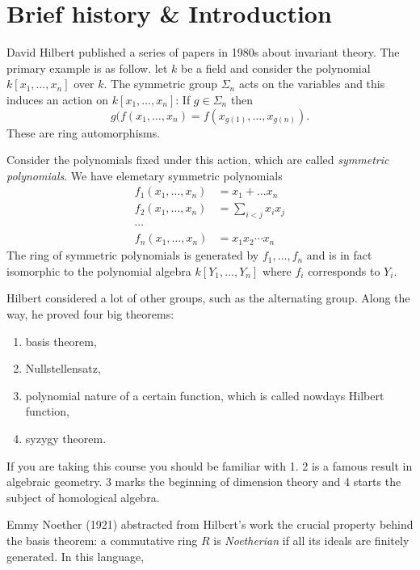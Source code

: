 \documentclass[a4paper]{article}
\begin{document}


\tableofcontents

\setcounter{section}{-1}

\section{Brief history \& Introduction}

David Hilbert published a series of papers in 1980s about invariant theory. The primary example is as follow. let \(k\)  be a field and consider the polynomial \(k[x_1, \dots, x_n]\) over \(k\). The symmetric group \(\Sigma_n\) acts on the variables and this induces an action on \(k[x_1, \dots, x_n]\): If \(g \in \Sigma_n\) then
\[
  g(f(x_1, \dots, x_n) = f(x_{g(1)}, \dots, x_{g(n)}).
\]
These are ring automorphisms.

Consider the polynomials fixed under this action, which are called \emph{symmetric polynomials}. We have elemetary symmetric polynomials
\begin{align*}
  f_1(x_1, \dots, x_n) &= x_1 + \dots x_n \\
  f_2(x_1, \dots, x_n) &= \sum_{i < j} x_i x_j \\
  \cdots & \\
  f_n(x_1, \dots, x_n) &= x_1x_2 \cdots x_n
\end{align*}
The ring of symmetric polynomials is generated by \(f_1, \dots, f_n\) and is in fact isomorphic to the polynomial algebra \(k[Y_1, \dots, Y_n]\) where \(f_i\) corresponds to \(Y_i\).

Hilbert considered a lot of other groups, such as the alternating group. Along the way, he proved four big theorems:
\begin{enumerate}
\item basis theorem,
\item Nullstellensatz,
\item polynomial nature of a certain function, which is called nowdays Hilbert function,
\item syzygy theorem.
\end{enumerate}
If you are taking this course you should be familiar with 1. 2 is a famous result in algebraic geometry. 3 marks the beginning of dimension theory and 4 starts the subject of homological algebra.

Emmy Noether (1921) abstracted from Hilbert's work the crucial property behind the basis theorem: a commutative ring \(R\) is \emph{Noetherian} if all its ideals are finitely generated. In this language,
\end{document}
